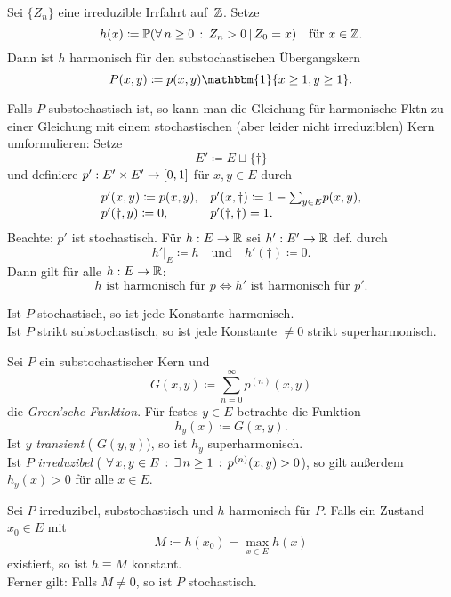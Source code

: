 \documentclass{cheat-sheet}
\renewcommand{\P}{\mathbb{P}} %
\newcommand{\ind}{\mathbbm{1}} %
\begin{document}
\begin{bsp}
  Sei $\{ Z_n \}$ eine irreduzible Irrfahrt auf~$\mathbb{Z}$.
  Setze
  \[
    h(x) \coloneqq \P(\fa{n \geq 0} Z_n > 0 \,|\, Z_0 = x)
    \quad \text{für } x \in \Z.
  \]
  Dann ist $h$ harmonisch für den substochastischen Übergangskern
  \[
    P(x, y) \coloneqq p(x, y) \ind \{ x \geq 1, y \geq 1 \}.
  \]
\end{bsp}

\begin{verf}
  Falls $P$ substochastisch ist, so kann man die Gleichung für harmonische Fktn zu einer Gleichung mit einem stochastischen (aber leider nicht irreduziblen) Kern umformulieren: Setze
  \[ E' \coloneqq E \sqcup \{ \dag \} \]
  und definiere $p' : E' \times E' \to \left[ 0, 1 \right]$ für $x, y \in E$ durch
  \[
    \begin{array}{l l}
      p'(x, y) \coloneqq p(x, y),
      & p'(x, \dag) \coloneqq 1 - {\sum}_{y \in E} p(x, y), \\
      p'(\dag, y) \coloneqq 0,
      & p'(\dag, \dag) = 1.
    \end{array}
  \]
  Beachte: $p'$ ist stochastisch.
  Für $h : E \to \mathbb{R}$ sei $h' : E' \to \mathbb{R}$ def. durch
  \[
    h'|_E \coloneqq h
    \quad \text{und} \quad
    h'(\dag) \coloneqq 0.
  \]
  Dann gilt für alle $h : E \to \mathbb{R}$:
  \[
    \text{$h$ ist harmonisch für $p$} \iff
    \text{$h'$ ist harmonisch für $p'$.}
  \]
\end{verf}

\begin{bem}
  Ist $P$ stochastisch, so ist jede Konstante harmonisch. \\
  Ist $P$ strikt substochastisch, so ist jede Konstante $\neq 0$ strikt superharmonisch.
\end{bem}

\begin{bsp}
  Sei $P$ ein substochastischer Kern und
  \[ G(x, y) \coloneqq {\sum}_{n=0}^\infty p^{(n)}(x, y) \]
  die \textit{Green'sche Funktion}.
  Für festes $y \in E$ betrachte die Funktion
  \[ h_y(x) \coloneqq G(x, y). \]
  Ist $y$ \textit{transient} (\dh{} $G(y, y)$), so ist $h_y$ superharmonisch. \\
  Ist $P$ \textit{irreduzibel} (\dh{} $\forall \, {x, y \in E} \,:\, \exists \, {n \geq 1} \,:\, p^{(n)}(x, y) > 0$), so gilt außerdem $h_y(x) > 0$ für alle $x \in E$.
\end{bsp}

\begin{lem}
  Sei $P$ irreduzibel, substochastisch und $h$ harmonisch für $P$.
  Falls ein Zustand $x_0 \in E$ mit
  \[
    M \coloneqq h(x_0) = \max_{x \in E} h(x)
  \]
  existiert, so ist $h \equiv M$ konstant. \\
  Ferner gilt: Falls $M \neq 0$, so ist $P$ stochastisch.
\end{lem}
\end{document}
